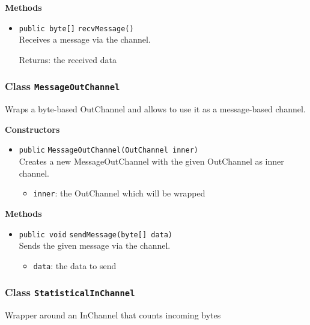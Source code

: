 \textbf{Methods}
\begin{itemize}
\item \lstinline|public byte[]| \lstinline|recvMessage|\lstinline|()|\\
Receives a message via the channel.

Returns: the received data

\end{itemize}

\subsubsection{Class \lstinline|MessageOutChannel|}
Wraps a byte-based OutChannel and allows to use it as a message-based
 channel. \\





\textbf{Constructors}
\begin{itemize}
\item \lstinline|public| \lstinline|MessageOutChannel|\lstinline|(OutChannel inner)|\\
Creates a new MessageOutChannel with the given OutChannel as inner channel.
\begin{itemize}
\item \lstinline|inner|: the OutChannel which will be wrapped
\end{itemize}



\end{itemize}


\textbf{Methods}
\begin{itemize}
\item \lstinline|public void| \lstinline|sendMessage|\lstinline|(byte[] data)|\\
Sends the given message via the channel.
\begin{itemize}
\item \lstinline|data|: the data to send
\end{itemize}



\end{itemize}

\subsubsection{Class \lstinline|StatisticalInChannel|}
Wrapper around an InChannel that counts incoming bytes \\



